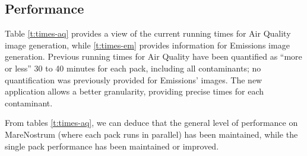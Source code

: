 \documentclass[11pt]{article}
\begin{document}
\subsection{Performance}
Table \ref{t:times-aq} provides a view of the current running times for Air Quality image generation, while \ref{t:times-em} provides information for Emissions image generation. Previous running times for Air Quality have been quantified as ``more or less'' 30 to 40 minutes for each pack, including all contaminants; no quantification was previously provided for Emissions' images. The new application allows a better granularity, providing precise times for each contaminant. 

From tables \ref{t:times-aq}, we can deduce that the general level of performance on MareNostrum (where each pack runs in parallel) has been maintained, while the single pack performance has been maintained or improved. 
\end{document}
